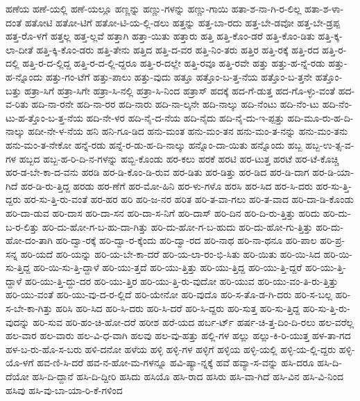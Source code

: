 {ಹಣೆಯ
ಹಣೆ-ಯಲ್ಲಿ
ಹಣೆ-ಯಲ್ಲೂ
ಹಣ್ಣನ್ನು
ಹಣ್ಣು-ಗಳನ್ನು
ಹಣ್ಣು-ಗಾಯಿ
ಹತಾ-ಶ-ನಾ-ಗಿ-ರ-ಲಿಲ್ಲ
ಹತಾ-ಶ-ಳಾ-ದಂತೆ
ಹತೋಟಿ
ಹತೋ-ಟಿಗೆ
ಹತೋ-ಟಿ-ಯ-ಲ್ಲಿ-ಡಲು
ಹತ್ತನ್ನು
ಹತ್ತ-ಬಾ-ರದು
ಹತ್ತ-ಬೇ-ಡವೋ
ಹತ್ತ-ಬೇ-ಡ್ರಪ್ಪ
ಹತ್ತ-ರೊ-ಳಗೆ
ಹತ್ತಲ್ಲ
ಹತ್ತ-ಲ್ಲವೆ
ಹತ್ತಾಗಿ
ಹತ್ತಾ-ಯಿತು
ಹತ್ತಾರು
ಹತ್ತಿ
ಹತ್ತಿ-ಕೊಂ-ಡರೆ
ಹತ್ತಿ-ಕೊಂ-ಡಿತು
ಹತ್ತಿ-ಕ್ಕ-ಲಾ-ದೀತೆ
ಹತ್ತಿ-ಕ್ಕಿ-ಕೊಂ-ಡರು
ಹತ್ತಿ-ತೇನು
ಹತ್ತಿದ
ಹತ್ತಿ-ದ-ವರ
ಹತ್ತಿ-ನಿಂ-ತರು
ಹತ್ತಿರ
ಹತ್ತಿ-ರಕ್ಕೆ
ಹತ್ತಿ-ರದ
ಹತ್ತಿ-ರ-ದಲ್ಲಿ
ಹತ್ತಿ-ರ-ದ-ಲ್ಲಿದ್ದ
ಹತ್ತಿ-ರ-ದ-ಲ್ಲಿ-ದ್ದರೂ
ಹತ್ತಿ-ರ-ದಲ್ಲೇ
ಹತ್ತಿ-ರವೂ
ಹತ್ತಿ-ರವೇ
ಹತ್ತು
ಹತ್ತು-ಹ-ನ್ನೆ-ರಡು
ಹತ್ತು-ಹ-ನ್ನೊಂದು
ಹತ್ತು-ಗಂ-ಟೆಗೆ
ಹತ್ತು-ಪಾಲು
ಹತ್ತು-ವುದು
ಹತ್ತೂ
ಹತ್ತೊಂ-ಬ-ತ್ತ-ನೆಯ
ಹತ್ತೊಂ-ಬ-ತ್ತನೇ
ಹತ್ತೊಂ-ಬತ್ತು
ಹತ್ರಾ-ಸಿಗೆ
ಹತ್ರಾ-ಸಿಗೇ
ಹತ್ರಾ-ಸಿ-ನಲ್ಲಿ
ಹತ್ರಾ-ಸಿ-ನಿಂದ
ಹತ್ರಾಸ್
ಹದಕ್ಕೆ
ಹದ-ಗೆ-ಡುತ್ತ
ಹದ-ಗೊ-ಳ್ಳು-ವಂತೆ
ಹದ-ವ-ರಿತು
ಹದಿ-ನಾ-ರನೇ
ಹದಿ-ನಾ-ರರ
ಹದಿ-ನಾರು
ಹದಿ-ನಾ-ಲ್ಕನೇ
ಹದಿ-ನಾಲ್ಕು
ಹದಿ-ನೆಂಟು
ಹದಿ-ನೆಂ-ಟು
ಹದಿ-ನೆಂ-ಟು-ಹ-ತ್ತೊಂ-ಬ-ತ್ತ-ನೆಯ
ಹದಿ-ನೇ-ಳರ
ಹದಿ-ನೈ-ದ-ನೆಯ
ಹದಿ-ನೈದು
ಹದಿ-ನೈ-ದು-ಇ-ಪ್ಪತ್ತು
ಹದಿ-ಮೂ-ರು-ಹ-ದಿ-ನಾಲ್ಕು
ಹದೀ-ನೇ-ಳ-ನೆಯ
ಹನಿ
ಹನಿ-ಗೂ-ಡಿದ
ಹನು-ಮಂತ
ಹನು-ಮಂ-ತನ
ಹನು-ಮಂ-ತ-ನನ್ನು
ಹನು-ಮಂ-ತನು
ಹನು-ಮಂ-ತ-ನೇಕೋ
ಹನ್ನೆ-ರಡು
ಹನ್ನೆ-ರ-ಡು-ಹ-ದಿ-ನಾಲ್ಕು
ಹನ್ನೊಂ-ದಾ-ಯಿತು
ಹನ್ನೊಂದು
ಹಬ್ಬ
ಹಬ್ಬ-ಉ-ತ್ಸ-ವ-ಗಳ
ಹಬ್ಬದ
ಹಬ್ಬ-ಹ-ರಿ-ದಿ-ನ-ಗಳನ್ನು
ಹಬ್ಬಿ-ಕೊಂಡು
ಹರ-ಕಲು
ಹರಕೆ
ಹರಟಿ
ಹರ-ಟುತ್ತ
ಹರಟೆ
ಹರ-ಟೆ-ಕೊಚ್ಚಿ
ಹರ-ಡ-ಬೇ-ಕಾ-ದ-ವನು
ಹರಡಿ
ಹರ-ಡಿ-ಕೊಂ-ಡಿ-ರುವ
ಹರ-ಡಿತು
ಹರ-ಡಿತ್ತು
ಹರ-ಡಿದ
ಹರ-ಡಿ-ದಾಗ
ಹರ-ಡಿ-ಯಾ-ಗಿದೆ
ಹರ-ಡಿ-ರು-ತ್ತಿದ್ದ
ಹರಡು
ಹರ-ಣೆಗೆ
ಹರ-ಮೋ-ಹಿನಿ
ಹರ-ಳು-ಗಳೊ
ಹರಸಿ
ಹರ-ಸಿದ
ಹರ-ಸಿ-ದರು
ಹರ-ಸು-ತ್ತಿ-ದ್ದರು
ಹರ-ಸು-ತ್ತಿ-ರು-ವಂತೆ
ಹರ-ಹರ
ಹರಿ
ಹರಿ-ಜ-ನರ
ಹರಿತ
ಹರಿ-ತ-ವಾ-ಗಲು
ಹರಿ-ತ-ವಾದ
ಹರಿ-ದಾ-ಡಿ-ಕೊಂಡು
ಹರಿ-ದಾ-ಡುವ
ಹರಿ-ದಾಸ
ಹರಿ-ದಾ-ಸನ
ಹರಿ-ದಾ-ಸ-ನಿಗೆ
ಹರಿ-ದಾಸ್
ಹರಿ-ದಿನ
ಹರಿ-ದಿ-ರು-ತ್ತಿತ್ತು
ಹರಿದು
ಹರಿ-ದು-ಬ-ರ-ಲಿತ್ತು
ಹರಿ-ದು-ಹೋ-ಗ-ಬ-ಹು-ದಾ-ಗಿತ್ತು
ಹರಿ-ದು-ಹೋ-ಗ-ಬ-ಹುದು
ಹರಿ-ದು-ಹೋ-ಗು-ತ್ತಿತ್ತು
ಹರಿ-ದು-ಹೋ-ದಂ-ತಾಗಿ
ಹರಿ-ದ್ವಾ-ರಕ್ಕೆ
ಹರಿ-ದ್ವಾ-ರ-ಕ್ಕೆಂದು
ಹರಿ-ದ್ವಾ-ರದ
ಹರಿ-ನಾಥ
ಹರಿ-ನಾ-ಥನೂ
ಹರಿ-ಪಾಲ
ಹರಿ-ಪ್ರ-ಸನ್ನ
ಹರಿ-ಯದೆ
ಹರಿ-ಯನ್ನು
ಹರಿ-ಯ-ಬೇ-ಕಾ-ದರೆ
ಹರಿ-ಯ-ಲಾ-ರಂ-ಭಿ-ಸಿತು
ಹರಿ-ಯಿತು
ಹರಿ-ಯಿ-ಸಿದ
ಹರಿ-ಯಿ-ಸು-ತ್ತಿದ್ದ
ಹರಿ-ಯಿ-ಸು-ತ್ತಿ-ದ್ದಾಳೆ
ಹರಿ-ಯು-ತ್ತದೆ
ಹರಿ-ಯು-ತ್ತಿತ್ತು
ಹರಿ-ಯು-ತ್ತಿದ್ದ
ಹರಿ-ಯು-ತ್ತಿ-ದ್ದರೆ
ಹರಿ-ಯು-ತ್ತಿ-ದ್ದಾಳೆ
ಹರಿ-ಯು-ತ್ತಿ-ದ್ದು-ದರ
ಹರಿ-ಯು-ತ್ತಿರ
ಹರಿ-ಯು-ತ್ತಿ-ರು-ವುದೋ
ಹರಿ-ಯುವ
ಹರಿ-ಯು-ವಂ-ತಿ-ರು-ತ್ತಿತ್ತು
ಹರಿ-ಯು-ವಂತೆ
ಹರಿ-ಯು-ವು-ದ-ರ-ಲ್ಲಿದೆ
ಹರಿ-ಯೇನೋ
ಹರಿ-ವುದೊ
ಹರಿ-ಸ-ತೊ-ಡ-ಗಿ-ದರು
ಹರಿ-ಸ-ಬಲ್ಲ
ಹರಿ-ಸ-ಬೇ-ಕಾ-ಗಿತ್ತು
ಹರಿಸಿ
ಹರಿ-ಸಿದ
ಹರಿ-ಸಿ-ದರು
ಹರಿ-ಸಿ-ದರೆ
ಹರಿ-ಸಿ-ದ್ದರು
ಹರಿ-ಸುತ್ತ
ಹರಿ-ಸು-ತ್ತಿದ್ದ
ಹರಿ-ಸು-ತ್ತಿ-ರು-ವುದನ್ನು
ಹರಿ-ಸುವ
ಹರಿ-ಹಂ-ಚಿ-ಹೋ-ದರೆ
ಹರೀಶ
ಹರೆ-ಯದ
ಹರ್ಬ-ರ್ಟ್
ಹರ್ಷ-ಚಿ-ತ್ತ-ದಿಂ-ದಿ-ರಲು
ಹಲ-ವರೆಲ್ಲ
ಹಲ-ವಾರ
ಹಲ-ವಾರು
ಹಲ-ವಿ-ಧ-ವಾಗಿ
ಹಲವು
ಹಲ-ವು-ಹತ್ತು
ಹಲ್ಲಿ-ಗಳ
ಹಲ್ಲು
ಹಲ್ಲು-ಕಿ-ರಿ-ಯುತ್ತ
ಹಳ-ತಾ-ಗದ
ಹಳ-ಬ-ರು-ಹೊ-ಸ-ಬರು
ಹಳಿ-ದನೋ
ಹಳೆಯ
ಹಳ್ಳಿ
ಹಳ್ಳಿ-ಗಳ
ಹಳ್ಳಿಗೆ
ಹಳ್ಳಿಯ
ಹಳ್ಳಿ-ಯಲ್ಲಿ
ಹಳ್ಳಿ-ಯ-ಲ್ಲಿ-ದ್ದರು
ಹಳ್ಳಿ-ಯೊ-ಳಗೆ
ಹವ-ಣಿ-ಸಿ-ದರೆ
ಹವ-ನ-ಹೋ-ಮ-ಗಳನ್ನೂ
ಹವಿ-ಷ್ಯಾ-ನ್ನಕ್ಕೆ
ಹವೆ
ಹವ್ಯಾ-ಸ-ವನ್ನು
ಹಸಿ-ದರೂ
ಹಸಿ-ದಿ-ದೆಯೋ
ಹಸಿ-ದಿ-ದ್ದಾನೆ
ಹಸಿ-ದಿ-ದ್ದೀರಿ
ಹಸಿದು
ಹಸಿಯೊ
ಹಸಿ-ರಾದ
ಹಸಿರು
ಹಸಿ-ವಾ-ಗಿದೆ
ಹಸಿ-ವಿನ
ಹಸಿ-ವಿ-ನಿಂದ
ಹಸಿವು
ಹಸಿ-ವು-ಬಾ-ಯಾ-ರಿ-ಕೆ-ಗಳಿಂದ
}
